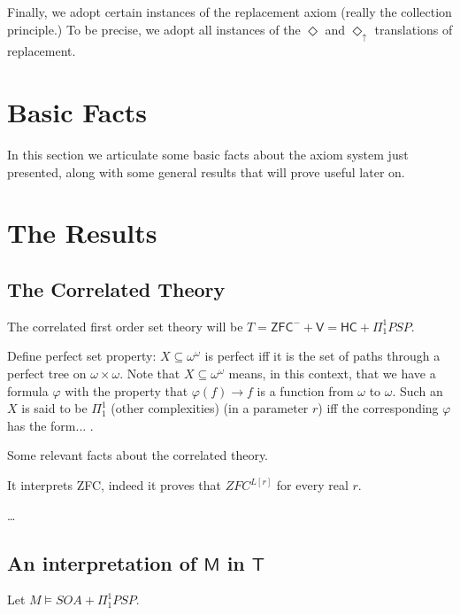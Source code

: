 \documentclass{article}
\theoremstyle{definition}
\newcommand{\du}{\Diamond_\uparrow}
\begin{document}
Finally, we adopt certain instances of the replacement axiom (really the 
collection principle.) To be precise, we adopt all instances of the $\Diamond$ and $\du$ translations 
of replacement.

\section{Basic Facts}
In this section we articulate some basic facts about the axiom system just presented, 
along with some general results that will prove useful later on.


\section{The Results}
\subsection{The Correlated Theory}
The correlated first order set theory will be 
$T = \mathsf{ZFC}^- + \mathsf{V = HC} + \Pi^1_1 PSP$. 

Define perfect set property: $X \subseteq \omega^\omega$ is perfect iff it is 
the set of paths through a perfect tree on $\omega \times \omega$. Note that 
$X \subseteq \omega^\omega$ means, in this context, that we have a formula 
$\varphi$ with the property that $\varphi(f) \rightarrow f$ is a function from 
$\omega$ to $\omega$. Such an $X$ is said to be $\Pi^1_1$ (other complexities)
 (in a parameter $r$) iff the 
corresponding $\varphi$ has the form... .

Some relevant facts about the correlated theory.

It interprets ZFC, indeed it proves that $ZFC^{L[r]}$ for every real $r$.

\dots

\subsection{An interpretation of $\mathsf{M}$ in $\mathsf{T}$}
 Let $M \vDash SOA + \Pi_1^1 PSP$.
\end{document}
